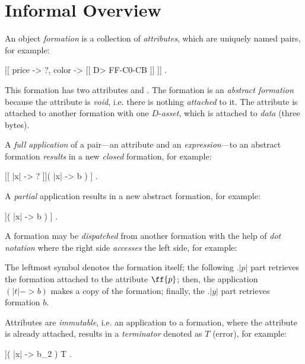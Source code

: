 
\section{Informal Overview}\label{sec:overview}

An object \emph{formation} is a collection of \emph{attributes},
  which are uniquely named pairs, for example:
%
\begin{phiquation}
\label{eq:price-color}
[[ price -> ?, color -> [[ D> FF-C0-CB ]] ]] {.}
\end{phiquation}
%
This formation has two attributes  and .
The formation is an \emph{abstract formation} because the  attribute
  is \emph{void}, i.e. there is nothing \emph{attached} to it.
The  attribute is attached to another formation
  with one $D$-\emph{asset},
  which is attached to \emph{data} (three bytes).

A \emph{full application} of a pair---an attribute and
  an \emph{expression}---to an abstract formation
  \emph{results} in a new \emph{closed} formation, for example:
%
\begin{phiquation}
\label{eq:simple-application}
[[ |x| -> ? ]]( |x| -> b ) \phiNormalize [[ |x| -> b ]] {.}
\end{phiquation}
%
A \emph{partial} application results in a new abstract formation, for example:
%
\begin{phiquation*}
[[ |x| -> ?, |y| -> ? ]]( |x| -> b ) \phiNormalize [[ |x| -> b, |y| -> ? ]] {.}
\end{phiquation*}

A formation may be \emph{dispatched} from another formation
  with the help of \emph{dot notation}
  where the right side \emph{accesses} the left side, for example:
%
%
The leftmost symbol \phiTerminal{\(\upxi\)} denotes the formation itself;
  the following $.|p|$ part retrieves the formation attached to the attribute \(\ff{p}\);
  then, the application $(|t|->b)$ makes a copy of the formation;
  finally, the $.|y|$ part retrieves formation \(b\).

Attributes are \emph{immutable}, i.e. an application to a formation,
  where the attribute is already attached,
  results in a \emph{terminator} denoted as $T$ (error), for example:
%
\begin{phiquation*}
[[ |x| -> b_1 ]]( |x| -> b_2 ) \phiNormalize T {.}
\end{phiquation*}

